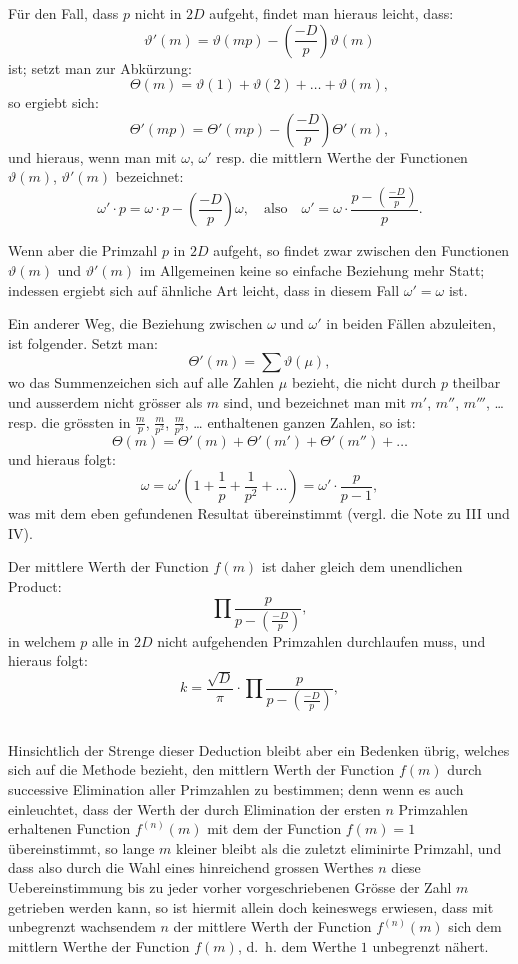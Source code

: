 \documentclass[12pt,a4paper]{article}
\begin{document}
Für den Fall, dass $p$ nicht in $2D$ aufgeht, findet man hieraus leicht, dass:
\[
\vartheta'(m) = \vartheta(mp) - \left(\frac{-D}{p}\right) \vartheta(m)
\]
ist; setzt man zur Abkürzung:
\[
\Theta(m) = \vartheta(1) + \vartheta(2) + \ldots + \vartheta(m),
\]
so ergiebt sich:
\[
\Theta'(mp) = \Theta'(mp) - \left(\frac{-D}{p}\right) \Theta'(m),
\]
und hieraus, wenn man mit $\omega$, $\omega'$ resp. die mittlern Werthe der Functionen $\vartheta(m)$, $\vartheta'(m)$ bezeichnet:
\[
\omega' \cdot p = \omega \cdot p - \left(\frac{-D}{p}\right) \omega, \quad \text{also} \quad \omega' = \omega \cdot \frac{p - \left(\frac{-D}{p}\right)}{p}.
\]

Wenn aber die Primzahl $p$ in $2D$ aufgeht, so findet zwar zwischen den Functionen $\vartheta(m)$ und $\vartheta'(m)$
im Allgemeinen keine so einfache Beziehung mehr Statt; indessen ergiebt sich auf ähnliche Art leicht,
dass in diesem Fall $\omega' = \omega$ ist.

Ein anderer Weg, die Beziehung zwischen $\omega$ und $\omega'$ in beiden Fällen abzuleiten, ist folgender.
Setzt man:
\[
\Theta'(m) = \sum \vartheta(\mu),
\]
wo das Summenzeichen sich auf alle Zahlen $\mu$ bezieht, die nicht durch $p$ theilbar und ausserdem nicht
grösser als $m$ sind, und bezeichnet man mit $m'$, $m''$, $m'''$, \ldots{} resp. die grössten in $\frac{m}{p}$,
$\frac{m}{p^2}$, $\frac{m}{p^3}$, \ldots{} enthaltenen ganzen Zahlen, so ist:
\[
\Theta(m) = \Theta'(m) + \Theta'(m') + \Theta'(m'') + \ldots
\]
und hieraus folgt:
\[
\omega = \omega' \left(1 + \frac{1}{p} + \frac{1}{p^2} + \ldots\right) = \omega' \cdot \frac{p}{p-1},
\]
was mit dem eben gefundenen Resultat übereinstimmt (vergl. die Note zu III und IV).

Der mittlere Werth der Function $f(m)$ ist daher gleich dem unendlichen Product:
\[
\prod \frac{p}{p - \left(\frac{-D}{p}\right)},
\]
in welchem $p$ alle in $2D$ nicht aufgehenden Primzahlen durchlaufen muss, und hieraus folgt:
\[
k = \frac{\sqrt{D}}{\pi} \cdot \prod \frac{p}{p - \left(\frac{-D}{p}\right)},
\]


\subsection*{}

Hinsichtlich der Strenge dieser Deduction bleibt aber ein Bedenken übrig, welches sich auf die Methode
bezieht, den mittlern Werth der Function $f(m)$ durch successive Elimination aller Primzahlen zu bestimmen;
denn wenn es auch einleuchtet, dass der Werth der durch Elimination der ersten $n$ Primzahlen erhaltenen
Function $f^{(n)}(m)$ mit dem der Function $f(m) = 1$ übereinstimmt, so lange $m$ kleiner bleibt als die
zuletzt eliminirte Primzahl, und dass also durch die Wahl eines hinreichend grossen Werthes $n$ diese
Uebereinstimmung bis zu jeder vorher vorgeschriebenen Grösse der Zahl $m$ getrieben werden kann,
so ist hiermit allein doch keineswegs erwiesen, dass mit unbegrenzt wachsendem $n$ der mittlere Werth der
Function $f^{(n)}(m)$ sich dem mittlern Werthe der Function $f(m)$, d.~h. dem Werthe $1$ unbegrenzt nähert.
\end{document}
